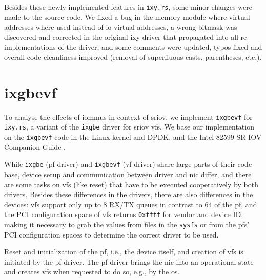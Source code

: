 \begin{minipage}{\textwidth}
    
\end{minipage}

Besides these newly implemented features in \texttt{ixy.rs}, some minor changes
were made to the source code. We fixed a bug in the memory module where virtual
addresses where used instead of \ac{io} virtual addresses, a wrong bitmask was
discovered and corrected in the original ixy driver \cite{emmerich2019user} that
propagated into all re-implementations \cite{emmerich2019case} of the driver,
and some comments were updated, typos fixed and overall code cleanliness
improved (removal of superfluous casts, parentheses, etc.).


\section{ixgbevf}
\label{sec:ixgbevf}

To analyse the effects of \acp{iommu} in context of \ac{sriov}, we implement
\texttt{ixgbevf} for \texttt{ixy.rs}, a variant of the \texttt{ixgbe} driver for
\ac{sriov} \acp{vf}. We base our implementation on the \texttt{ixgbevf} code in
the Linux kernel and DPDK, and the Intel 82599 SR-IOV Companion Guide
\cite{intel201082599}.

While \texttt{ixgbe} (\ac{pf} driver) and \texttt{ixgbevf} (\ac{vf} driver)
share large parts of their code base, device setup and communication between
driver and \ac{nic} differ, and there are some tasks on \acp{vf} (like reset)
that have to be executed cooperatively by both drivers. Besides these
differences in the drivers, there are also differences in the devices: \acp{vf}
support only up to 8 RX/TX queues in contrast to 64 of the \ac{pf}, and the PCI
configuration space of \acp{vf} returns \texttt{0xffff} for vendor and device
ID, making it necessary to grab the values from files in the \texttt{sysfs} or
from the \acp{pf}' PCI configuration spaces to determine the correct driver to
be used.

Reset and initialization of the \ac{pf}, i.e., the device itself, and creation
of \acp{vf} is initiated by the \ac{pf} driver. The \ac{pf} driver brings the
\ac{nic} into an operational state and creates \acp{vf} when requested to do so,
e.g., by the \ac{os}.

